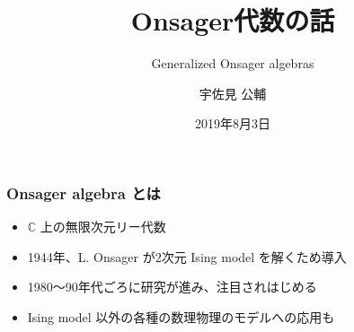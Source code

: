 \documentclass{beamer}
\title{Onsager代数の話}
\subtitle{Generalized Onsager algebras}
\author{宇佐見 公輔}
\date{2019年8月3日}
\theoremstyle{definition}
\begin{document}
\begin{frame}
    \titlepage{}
\end{frame}

\begin{frame}
    \frametitle{Onsager algebra とは}

    \begin{itemize}
        \item \(\mathbb{C}\) 上の無限次元リー代数
        \item 1944年、L. Onsager が2次元 Ising model を解くため導入
        \item 1980〜90年代ごろに研究が進み、注目されはじめる
        \item Ising model 以外の各種の数理物理のモデルへの応用も
    \end{itemize}
\end{frame}
\end{document}
